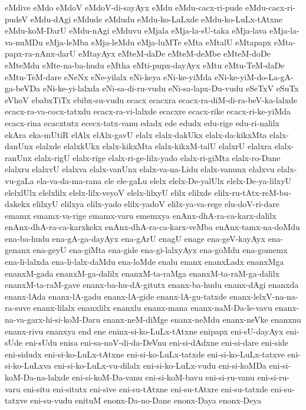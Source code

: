 {eMdive
eMdo
eMdoV
eMdoV-di-sayAyx
eMdu
eMdu-cacx-ri-pude
eMdu-cacx-ri-pudeV
eMdu-dAgi
eMdude
eMdudu
eMdu-ko-LaLxde
eMdu-ko-LuLx-tAtxne
eMdu-koM-DarU
eMdu-nAgi
eMduvu
eMjala
eMja-la-sU-taka
eMja-lava
eMja-la-va-nuMDu
eMja-leMba
eMja-leMdu
eMja-luMTe
eMta
eMtalU
eMtapapx
eMta-papx-ra-nAnx-darU
eMtayAyx
eMteM-daDe
eMteM-deMbe
eMteM-doDe
eMteMdu
eMte-na-ba-hudu
eMtha
eMti-pupx-dayAyx
eMtu
eMtu-TeM-daDe
eMtu-TeM-dare
eNeNx
eNe-yilalx
eNi-keya
eNi-ke-yiMda
eNi-ke-yiM-do-La-gA-ga-beVDa
eNi-ke-yi-lalxda
eNi-sa-di-ru-vudu
eNi-sa-lapx-Du-vudu
eSeTxV
eSuTx
eVhoV
ebabxTiTx
ebibx-su-vudu
ecacx
ecacxra
ecacx-ra-diM-di-ra-beV-ka-lalxde
ecacx-ra-va-cocx-tatxdu
ecacx-ra-vi-lalxde
ecacxre
ecacx-rike
ecacx-ri-ke-yiMda
ecacx-rina
ecacxtutx
ececx-tatx-vanu
edadx
ede
edudx
edu-rige
edu-ri-nalilx
ekAra
eka-mUtiR
elAlx
elAlx-gavU
elalx
elalx-dakUkx
elalx-da-kikxMta
elalx-danUnx
elalxde
elalxkUkx
elalx-kikxMta
elalx-kikxM-talU
elalxrU
elalxra
elalx-ranUnx
elalx-rigU
elalx-rige
elalx-ri-ge-lilx-yado
elalx-ri-giMta
elalx-ro-Dane
elalxru
elalxvU
elalxva
elalx-vanUnx
elalx-va-na-Lidu
elalx-vanunx
elalxvu
elalx-vu-gaLa
ela-va-da-ma-rana
ele
ele-gaLu
elelx
elelx-De-yalUlx
elelx-De-ya-lilxyU
elelxlUlx
elelxlilx
elelx-lilx-veyoV
elelx-lilxyU
elilx
elilxde
elilx-ru-tAtx-reM-bu-dakekx
elilxyU
elilxya
elilx-yado
elilx-yadoV
elilx-ya-va-rege
elu-doV-ri-dare
emamx
emamx-va-rige
emamx-varu
ememxya
enAnx-dhA-ra-ca-karx-dalilx
enAnx-dhA-ra-ca-karxkekx
enAnx-dhA-ra-ca-karx-veMba
enAnx-tamx-na-doMdu
ena-ba-hudu
ena-gA-ga-dayAyx
ena-gArU
enagU
enage
ena-geV-kayAyx
ena-genanx
ena-geyU
ena-giMta
ena-gide
ena-gi-lalxyAyx
ena-goMdu
ena-gomemx
ena-li-lalxda
ena-li-lalx-daMdu
ena-loMde
enalu
enanx
enanxLadx
enanxMga
enanxM-gada
enanxM-ga-dalilx
enanxM-ta-raMga
enanxM-ta-raM-ga-dalilx
enanxM-ta-raM-gave
enanx-ba-hu-dA-gitutx
enanx-ba-hudu
enanx-dAgi
enanxda
enanx-lAda
enanx-lA-gadu
enanx-lA-gide
enanx-lA-gu-tatxde
enanx-lelxV-na-na-ra-suve
enanx-lilalx
enanxlilx
enanxlu
enanx-mana
enanx-naM-Da-le-vavu
enanx-na-va-garx-hi-si-koM-Daru
enanx-neM-diMge
enanx-neMdu
enanx-neVke
enanxnu
enanx-rivu
enanxya
end
ene
eninx-si-ko-LuLx-tAtxne
enipapx
eni-sU-dayAyx
eni-sUde
eni-sUdu
enisa
eni-sa-noV-di-da-DeVnu
eni-si-dAdxne
eni-si-dare
eni-side
eni-sidudx
eni-si-ko-LuLx-tAtxne
eni-si-ko-LuLx-tatxde
eni-si-ko-LuLx-tatxve
eni-si-ko-LuLxva
eni-si-ko-LuLx-vu-dilalx
eni-si-ko-LuLx-vudu
eni-si-koMDa
eni-si-koM-Da-na-lalxde
eni-si-koM-Da-vanu
eni-si-koM-bavu
eni-si-ru-vanu
eni-si-ru-varu
eni-situ
eni-situtx
eni-sive
eni-su-tAtxne
eni-su-tAtxre
eni-su-tatxde
eni-su-tatxve
eni-su-vudu
enituM
enonx-Da-no-Dane
enonx-Daya
enonx-Deya
}
